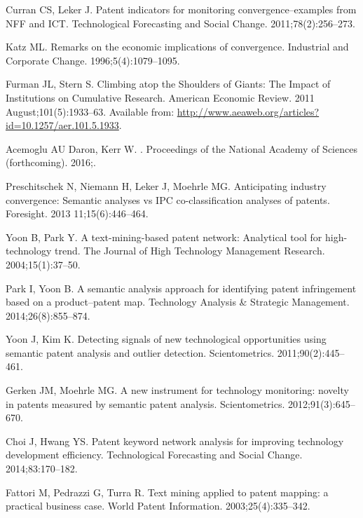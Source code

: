 \documentclass[12pt,twoside,a4paper]{article}
\begin{document}
\begin{thebibliography}{10}
Curran CS, Leker J.
\newblock Patent indicators for monitoring convergence--examples from NFF and
  ICT.
\newblock Technological Forecasting and Social Change. 2011;78(2):256--273.

Katz ML.
\newblock Remarks on the economic implications of convergence.
\newblock Industrial and Corporate Change. 1996;5(4):1079--1095.

Furman JL, Stern S.
\newblock Climbing atop the Shoulders of Giants: The Impact of Institutions on
  Cumulative Research.
\newblock American Economic Review. 2011 August;101(5):1933--63.
\newblock Available from:
  \url{http://www.aeaweb.org/articles?id=10.1257/aer.101.5.1933}.

Acemoglu AU Daron, Kerr W.
.
\newblock Proceedings of the National Academy of Sciences (forthcoming). 2016;.

Preschitschek N, Niemann H, Leker J, Moehrle MG.
\newblock Anticipating industry convergence: Semantic analyses vs IPC
  co-classification analyses of patents.
\newblock Foresight. 2013 11;15(6):446--464.

Yoon B, Park Y.
\newblock A text-mining-based patent network: Analytical tool for
  high-technology trend.
\newblock The Journal of High Technology Management Research.
  2004;15(1):37--50.

Park I, Yoon B.
\newblock A semantic analysis approach for identifying patent infringement
  based on a product--patent map.
\newblock Technology Analysis \& Strategic Management. 2014;26(8):855--874.

Yoon J, Kim K.
\newblock Detecting signals of new technological opportunities using semantic
  patent analysis and outlier detection.
\newblock Scientometrics. 2011;90(2):445--461.

Gerken JM, Moehrle MG.
\newblock A new instrument for technology monitoring: novelty in patents
  measured by semantic patent analysis.
\newblock Scientometrics. 2012;91(3):645--670.

Choi J, Hwang YS.
\newblock Patent keyword network analysis for improving technology development
  efficiency.
\newblock Technological Forecasting and Social Change. 2014;83:170--182.

Fattori M, Pedrazzi G, Turra R.
\newblock Text mining applied to patent mapping: a practical business case.
\newblock World Patent Information. 2003;25(4):335--342.


\end{thebibliography}
\end{document}
